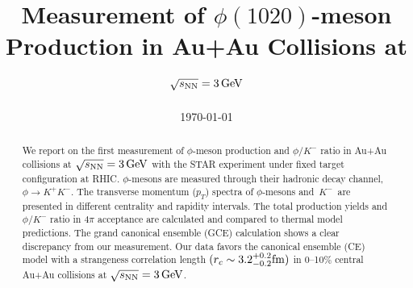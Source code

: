 \documentclass[%
 reprint,	
showpacs,
 amsmath,amssymb,
 aps,
 prc,
]{revtex4-1}
\begin{document}

\title{Measurement of $\phi(1020)$-meson Production in Au+Au Collisions at ${\sqrt{s_{\rm NN}} = \rm{3\,GeV}}$}%


\noaffiliation

\date{\today}%

\begin{abstract}


We report on the first measurement of $\phi$-meson production and $\phi/K^-$ ratio in Au+Au collisions at ${\sqrt{s_{\rm NN}} = \rm{3\,GeV}}$ with the STAR experiment under fixed target configuration at RHIC. $\phi$-mesons are measured through their hadronic decay channel, $\phi\rightarrow K^+K^-$. The transverse momentum ($p_T$) spectra of $\phi$-mesons and $K^-$ are presented in different centrality and rapidity intervals. The total production yields and $\phi/K^-$ ratio in $4\pi$ acceptance are calculated and compared to thermal model predictions. The grand canonical ensemble (GCE) calculation shows a clear discrepancy from our measurement. Our data favors the canonical ensemble (CE) model with a strangeness correlation length $(r_c   \sim 3.2_{-0.2}^{+0.2} \rm{fm})$ in 0--10\% central Au+Au collisions at ${\sqrt{s_{\rm NN}} = \rm{3\,GeV}}$.


\end{abstract}
\end{document}
